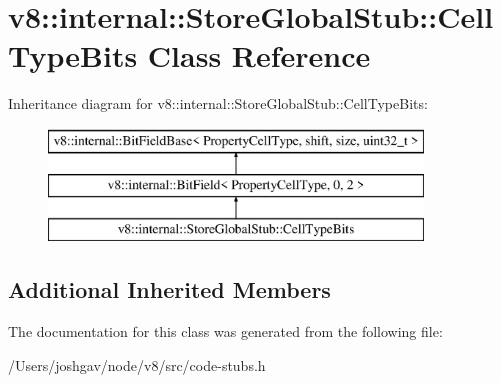 \hypertarget{classv8_1_1internal_1_1_store_global_stub_1_1_cell_type_bits}{}\section{v8\+:\+:internal\+:\+:Store\+Global\+Stub\+:\+:Cell\+Type\+Bits Class Reference}
\label{classv8_1_1internal_1_1_store_global_stub_1_1_cell_type_bits}
Inheritance diagram for v8\+:\+:internal\+:\+:Store\+Global\+Stub\+:\+:Cell\+Type\+Bits\+:\begin{figure}[H]
\begin{center}
\leavevmode
\includegraphics[height=3.000000cm]{classv8_1_1internal_1_1_store_global_stub_1_1_cell_type_bits}
\end{center}
\end{figure}
\subsection*{Additional Inherited Members}


The documentation for this class was generated from the following file\+:\begin{DoxyCompactItemize}
\item 
/\+Users/joshgav/node/v8/src/code-\/stubs.\+h\end{DoxyCompactItemize}
